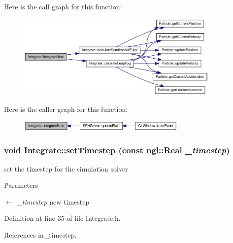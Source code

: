 Here is the call graph for this function:\nopagebreak
\begin{figure}[H]
\begin{center}
\leavevmode
\includegraphics[width=281pt]{class_integrate_ada967b8b2b909f7c827009dad33738ec_cgraph}
\end{center}
\end{figure}




Here is the caller graph for this function:\nopagebreak
\begin{figure}[H]
\begin{center}
\leavevmode
\includegraphics[width=234pt]{class_integrate_ada967b8b2b909f7c827009dad33738ec_icgraph}
\end{center}
\end{figure}


\hypertarget{class_integrate_afc825f2a88811940160aec5243d2d51c}{
\subsubsection[{setTimestep}]{\setlength{\rightskip}{0pt plus 5cm}void Integrate::setTimestep (const ngl::Real {\em \_\-timestep})}}
\label{class_integrate_afc825f2a88811940160aec5243d2d51c}


set the timestep for the simulation solver 


\begin{DoxyParams}{Parameters}
\item[\mbox{$\leftarrow$} {\em \_\-timestep}]new timestep \end{DoxyParams}


Definition at line 35 of file Integrate.h.



References m\_\-timestep.




